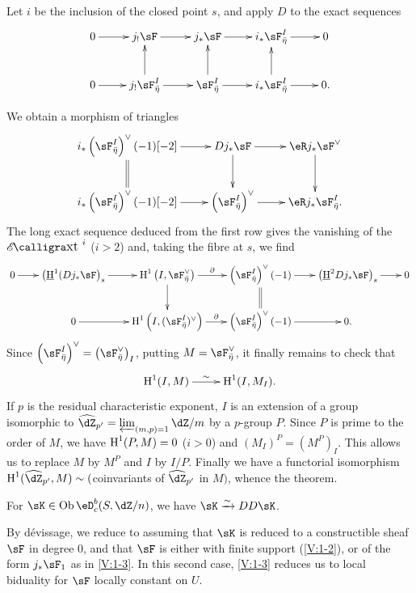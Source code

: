 Let $i$ be the inclusion of the closed point $s$, and apply $D$ to the exact
sequences
\[\xymatrix{
  0 \ar[r]
    & j_! \sF \ar[r]
    & j_\ast \sF \ar[r]
    & i_\ast \sF_{\bar\eta}^I \ar[r]
    & 0 \\
  0 \ar[r]
    & j_! \sF_{\bar\eta}^I \ar[r] \ar[u]
    & \sF_{\bar\eta}^I \ar[r] \ar[u]
    & i_\ast \sF_{\bar\eta}^I \ar[r] \ar[u]
    & 0 \text{.}
}\]

We obtain a morphism of triangles
\[\xymatrix{
  i_\ast\left(\sF_{\bar\eta}^I\right)^\vee (-1)[-2] \ar[r] \ar@{=}[d]
    & D j_\ast\sF \ar[r] \ar[d]
    & \eR j_\ast \sF^\vee \ar[d] \\
  i_\ast\left(\sF_{\bar\eta}^I\right)^\vee(-1)[-2] \ar[r]
    & \left(\sF_{\bar\eta}^I\right)^\vee \ar[r]
    & \eR j_\ast \sF_{\bar\eta}^I \text{.}
}\]
The long exact sequence deduced from the first row gives the vanishing of the
$\Ext^i$ ($i>2$) and, taking the fibre at $s$, we find
\[\xymatrix@=0.7cm{
  0 \ar[r]
    & \left(\underline\h^1(D j_\ast\sF\right)_s \ar[r]
    & \h^1\left(I,\sF_{\bar\eta}^\vee\right) \ar[r]^-\partial \ar[d]
    & \left(\sF_{\bar\eta}^I\right)^\vee(-1) \ar[r] \ar@{=}[d]
    & \left(\underline\h^2 D j_\ast\sF\right)_s \ar[r]
    & 0 \\
  & 0 \ar[r]
    & \h^1\left(I,(\sF_{\bar\eta}^I)^\vee\right) \ar[r]^-\partial
    & \left(\sF_{\bar\eta}^I\right)^\vee(-1) \ar[r]
    & 0 \text{.}
}\]
Since
$\left(\sF_{\bar\eta}^I\right)^\vee = \left(\sF_{\bar\eta}^\vee\right)_I$,
putting $M=\sF_{\bar\eta}^\vee$, it finally remains to check that
\[\xymatrix{
  \h^1(I,M) \ar[r]^-\sim
    & \h^1(I,M_I) \text{.}
}\]
If $p$ is the residual characteristic exponent, $I$ is an extension of a
group isomorphic to $\widehat\dZ_{p'} = \varprojlim_{(m,p)=1} \dZ/m$ by a
$p$-group $P$. Since $P$ is prime to the order of $M$, we have
$\operatorname{H}^1(P,M)=0$ ($i>0$) and $(M_I)^P=(M^P)_I$. This allows us to replace $M$ by
$M^P$ and $I$ by $I/P$. Finally we have a functorial isomorphism
$\h^1(\widehat\dZ_{p'},M)\sim ($coinvariants of $\widehat\dZ_{p'}$ in $M)$,
whence the theorem.




\begin{theorem_}\label{V:1-4}
For $\sK\in \ob\eD_c^b(S,\dZ/n)$, we have $\sK\iso D D \sK$.
\end{theorem_}

By d\'evissage, we reduce to assuming that $\sK$ is reduced to a
constructible sheaf $\sF$ in degree $0$, and that $\sF$ is either with finite
support (\ref{V:1-2}), or of the form $j_\ast\sF_1$ as in \ref{V:1-3}. In
this second case, \ref{V:1-3} reduces us to local biduality for $\sF$
locally constant on $U$.











